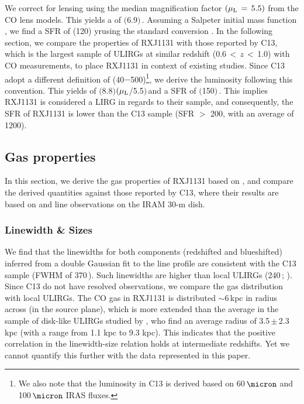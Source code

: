 \documentclass[]{emulateapj}
\begin{document}
We correct for lensing using the median magnification factor $(\mu_{\rm L}\,=\,5.5)$
from the CO lens models. This yields a \LFIR of $($6.9$)$\,\Lsun.
Assuming a Salpeter initial
mass function \citep{Salpeter55a}, we find a
SFR of (120)\,\Msun\,yr\pmOne using the
standard conversion \citep{Kennicutt98a}. 
In the following section, we compare the properties of RXJ1131 
with those reported by C13, which is the largest sample of
ULIRGs at similar redshift (0.6\,$<$\,$z$\,$<$\,1.0) with CO measurements,
to place RXJ1131 in context of existing studies.  
Since C13 adopt a different definition of 
\LFIR (40$-$500\micron)\footnote{We also note that the \fir luminosity in C13 is derived 
based on 60\,$\micron$ and 100\,$\micron$ IRAS fluxes.}, we derive the \fir luminosity
following this convention.
This yields \LFIR of $($8.8$)$$(\mu_{\rm L}$/5.5$)$\,\Lsun and 
a SFR of $($150$)$\,\sfrU. 
This implies RXJ1131 is considered a LIRG in regards to their sample, and consequently, 
the SFR of RXJ1131 is lower than the C13 sample (SFR $>$ 200, with an average of 1200).

\subsection{Gas properties} \label{sec:properties}
In this section, we derive the gas properties of RXJ1131 based on \bco,
and compare the derived quantities against those reported by
C13, where their results are based on \bco and  line observations on the IRAM 30-m dish.

\subsubsection{Linewidth \& Sizes}
We find that the linewidths for both components (redshifted and blueshifted)
inferred from a double Gaussian fit to the line profile are
consistent with the C13 sample (FWHM of 370\,\kms). Such linewidths are higher
than local ULIRGs (240\,\kms; \citealt[][]{Solomon97a}).
Since C13 do not have resolved observations, we compare the
gas distribution with local ULIRGs. The CO gas in RXJ1131 is
distributed $\sim$6\,kpc in radius across (in
the source plane), which is more extended than the average in the
sample of disk-like ULIRGs studied by \citet{Ueda14a},
who find an average radius of 3.5\,$\pm$\,2.3\,kpc
(with a range from 1.1 kpc to 9.3 kpc).
This indicates that the positive correlation in the linewidth-size relation
holds at intermediate redshifts. Yet we cannot quantify this further
with the data represented in this paper.
\end{document}
